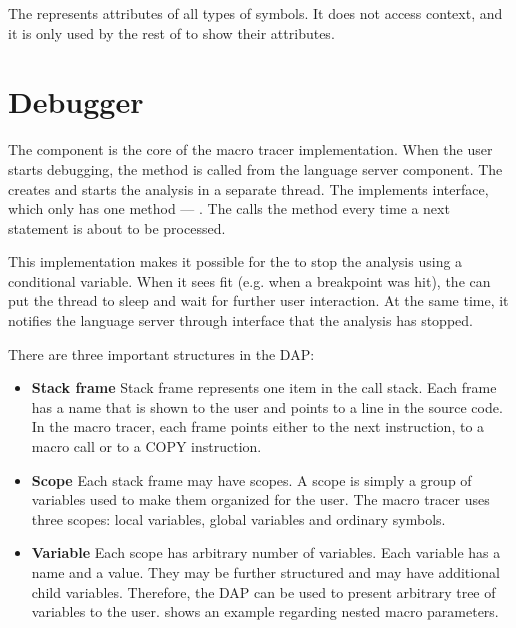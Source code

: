 The  represents attributes of all types of symbols. It does not access context, and it is only used by the rest of  to show their attributes.

\section{Debugger}

The  component is the core of the macro tracer implementation. When the user starts debugging, the method  is called from the language server component. The  creates  and starts the analysis in a separate thread. The  implements  interface, which only has one method --- . The  calls the  method every time a next statement is about to be processed.

This implementation makes it possible for the  to stop the analysis using a conditional variable. When it sees fit (e.g. when a breakpoint was hit), the  can put the thread to sleep and wait for further user interaction. At the same time, it notifies the language server through  interface that the analysis has stopped.

There are three important structures in the DAP:
\begin{itemize}
	\item \textbf{Stack frame} Stack frame represents one item in the call stack. Each frame has a name that is shown to the user and points to a line in the source code. In the macro tracer, each frame points either to the next instruction, to a macro call or to a COPY instruction.
	\item \textbf{Scope} Each stack frame may have scopes. A scope is simply a group of variables used to make them organized for the user. The macro tracer uses three scopes: local variables, global variables and ordinary symbols.
	\item \textbf{Variable} Each scope has arbitrary number of variables. Each variable has a name and a value. They may be further structured and may have additional child variables. Therefore, the DAP can be used to present arbitrary tree of variables to the user.  shows an example regarding nested macro parameters.

\end{itemize}

